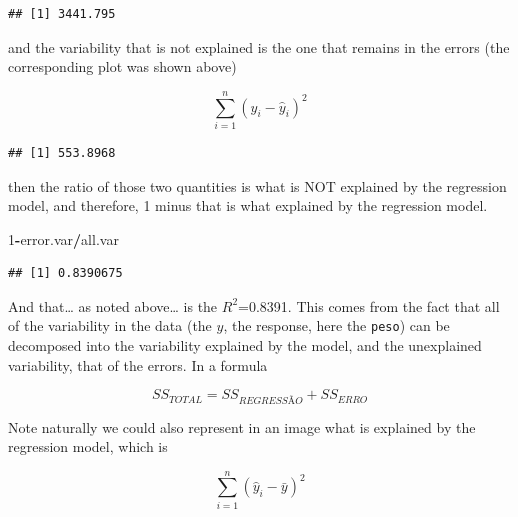 \documentclass[
]{book}
\newenvironment{Shaded}{\begin{snugshade}}{\end{snugshade}}
\newcommand{\CommentTok}[1]{\textcolor[rgb]{0.56,0.35,0.01}{\textit{#1}}}
\newcommand{\DataTypeTok}[1]{\textcolor[rgb]{0.13,0.29,0.53}{#1}}
\newcommand{\DecValTok}[1]{\textcolor[rgb]{0.00,0.00,0.81}{#1}}
\newcommand{\KeywordTok}[1]{\textcolor[rgb]{0.13,0.29,0.53}{\textbf{#1}}}
\newcommand{\NormalTok}[1]{#1}
\newcommand{\OperatorTok}[1]{\textcolor[rgb]{0.81,0.36,0.00}{\textbf{#1}}}
\begin{document}
\begin{verbatim}
## [1] 3441.795
\end{verbatim}

and the variability that is not explained is the one that remains in the errors (the corresponding plot was shown above)

\[\sum_{i=1}^n (y_i- \hat y_i)^2\]

\begin{Shaded}
\end{Shaded}

\begin{verbatim}
## [1] 553.8968
\end{verbatim}

then the ratio of those two quantities is what is NOT explained by the regression model, and therefore, 1 minus that is what explained by the regression model.

\begin{Shaded}
\begin{Highlighting}[]
\DecValTok{1}\OperatorTok{-}\NormalTok{error.var}\OperatorTok{/}\NormalTok{all.var}
\end{Highlighting}
\end{Shaded}

\begin{verbatim}
## [1] 0.8390675
\end{verbatim}

And that\ldots{} as noted above\ldots{} is the \(R^2\)=0.8391. This comes from the fact that all of the variability in the data (the \(y\), the response, here the \texttt{peso}) can be decomposed into the variability explained by the model, and the unexplained variability, that of the errors. In a formula

\[SS_{TOTAL}=SS_{REGRESSÃO}+SS_{ERRO}\]

Note naturally we could also represent in an image what is explained by the regression model, which is

\[\sum_{i=1}^n (\hat y_i- \bar y)^2\]

\begin{Shaded}
\end{Shaded}
\end{document}
